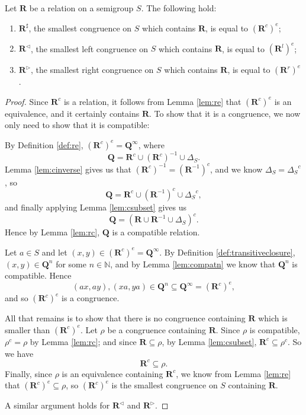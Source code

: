 \begin{theorem}
  \label{thm:rsharp}
  Let $\mathbf{R}$ be a relation on a semigroup $S$.
  The following hold:
  \begin{enumerate}
  \item $\mathbf{R}^\sharp$, the smallest congruence on $S$ which contains
    $\mathbf{R}$, is equal to $(\mathbf{R}^c)^e$;
  \item $\mathbf{R}^\triangleleft$, the smallest left congruence on $S$ which
    contains $\mathbf{R}$, is equal to $(\mathbf{R}^l)^e$;
  \item $\mathbf{R}^\triangleright$, the smallest right congruence on $S$ which
    contains $\mathbf{R}$, is equal to $(\mathbf{R}^r)^e$.
  \end{enumerate}
  \begin{proof}
    Since $\mathbf{R}^c$ is a relation, it follows from Lemma \ref{lem:re} that
    $(\mathbf{R}^c)^e$ is an equivalence, and it certainly contains
    $\mathbf{R}$.  To show that it is a congruence, we now only need to show
    that it is compatible:

    By Definition \ref{def:re}, $(\mathbf{R}^c)^e = \mathbf{Q}^\infty$, where
    $$\mathbf{Q} =
    \mathbf{R}^c \cup
    (\mathbf{R}^c)^{-1} \cup
    \Delta_S.$$
    Lemma \ref{lem:cinverse} gives us that
    $(\mathbf{R}^c)^{-1} = (\mathbf{R}^{-1})^c$, and
    we know
    $\Delta_S = {\Delta_S}^c$, so
    $$\mathbf{Q} =
    \mathbf{R}^c \cup
    (\mathbf{R}^{-1})^c \cup
    {\Delta_S}^c,$$
    and finally applying Lemma \ref{lem:csubset} gives us
    $$\mathbf{Q} =
    (\mathbf{R} \cup \mathbf{R}^{-1} \cup \Delta_S)^c.$$
    Hence by Lemma \ref{lem:rc}, $\mathbf{Q}$ is a compatible relation.

    Let $a \in S$ and let $(x,y) \in (\mathbf{R}^c)^e = \mathbf{Q}^\infty$.
    By Definition \ref{def:transitiveclosure}, $(x,y) \in \mathbf{Q}^n$ for some
    $n \in \mathbb{N}$, and by Lemma \ref{lem:compatn} we know that
    $\mathbf{Q}^n$ is compatible.  Hence
    $$(ax,ay), (xa, ya) \in \mathbf{Q}^n \subseteq \mathbf{Q}^\infty =
    (\mathbf{R}^c)^e,$$ and so $(\mathbf{R}^c)^e$ is a congruence.

    All that remains is to show that there is no congruence containing
    $\mathbf{R}$ which is smaller than $(\mathbf{R}^c)^e$.
    Let $\rho$ be a congruence containing $\mathbf{R}$.  Since $\rho$ is
    compatible, $\rho^c = \rho$ by Lemma \ref{lem:rc}; and since $\mathbf{R}
    \subseteq \rho$, by Lemma \ref{lem:csubset}, $\mathbf{R}^c \subseteq
    \rho^c$.  So we have
    $$\mathbf{R}^c \subseteq \rho.$$
    Finally, since $\rho$ is an equivalence containing $\mathbf{R}^c$, we know
    from Lemma \ref{lem:re} that $(\mathbf{R}^c)^e \subseteq \rho$, so
    $(\mathbf{R}^c)^e$ is the smallest congruence on $S$ containing
    $\mathbf{R}$. \cite[p.26-27]{howie}

    A similar argument holds for $\mathbf{R}^\triangleleft$ and
    $\mathbf{R}^\triangleright$.
  \end{proof}
\end{theorem}

